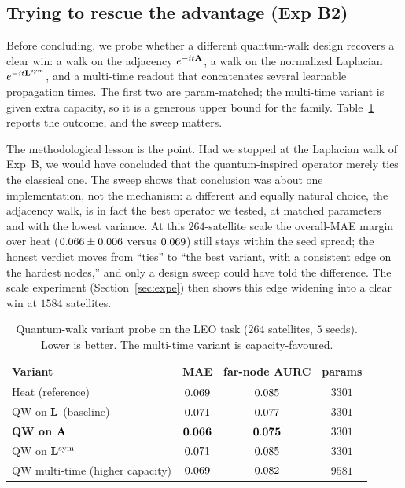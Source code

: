 \subsection{Trying to rescue the advantage (Exp B2)}
Before concluding, we probe whether a different quantum-walk design recovers a clear
win: a walk on the adjacency $e^{-it\mathbf{A}}$, a walk on the normalized Laplacian
$e^{-it\mathbf{L}^{\mathrm{sym}}}$, and a multi-time readout that concatenates several
learnable propagation times. The first two are param-matched; the multi-time variant
is given extra capacity, so it is a generous upper bound for the family.
Table~\ref{tab:variants} reports the outcome, and the sweep matters.
\bbVariantNote

The methodological lesson is the point. Had we stopped at the Laplacian walk of
Exp~B, we would have concluded that the quantum-inspired operator merely ties the
classical one. The sweep shows that conclusion was about one implementation, not the
mechanism: a different and equally natural choice, the adjacency walk, is in fact the
best operator we tested, at matched parameters and with the lowest variance. At this
$264$-satellite scale the overall-MAE margin over heat
($0.066\pm0.006$ versus $0.069$) still stays within the seed spread; the
honest verdict moves from ``ties'' to ``the best variant, with a consistent edge on the
hardest nodes,'' and only a design sweep could have told the difference. The scale
experiment (Section~\ref{sec:expe}) then shows this edge widening into a clear win at
$1584$ satellites.

\begin{table}[t]
\centering
\caption{Quantum-walk variant probe on the LEO task ($264$ satellites, $5$ seeds).
Lower is better. The multi-time variant is capacity-favoured.}
\label{tab:variants}
\renewcommand{\arraystretch}{1.2}
\begin{tabular}{@{}lccc@{}}
\toprule
Variant & MAE & far-node AURC & params \\
\midrule
Heat (reference)                 & $0.069$ & $0.085$ & $3301$ \\
QW on $\mathbf{L}$ (baseline)          & $0.071$  & $0.077$  & $3301$ \\
\textbf{QW on $\mathbf{A}$}            & $\mathbf{0.066}$ & $\mathbf{0.075}$ & $3301$ \\
QW on $\mathbf{L}^{\mathrm{sym}}$      & $0.071$ & $0.085$ & $3301$ \\
QW multi-time (higher capacity)  & $0.069$ & $0.082$ & $9581$ \\
\bottomrule
\end{tabular}
\end{table}

